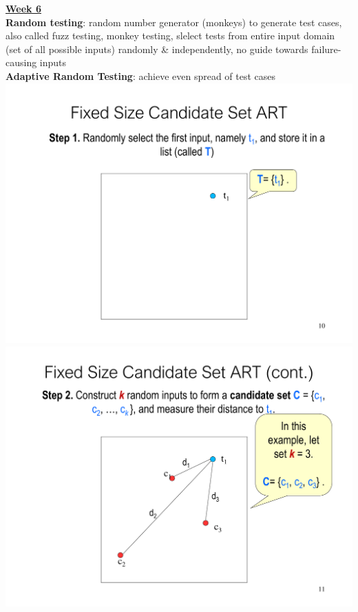 \documentclass[a4paper]{article}
\begin{document}
\begin{multicols}{3}
        \vfill\null\columnbreak\noindent\underline{\textbf{Week 6}}\\
        \textbf{Random testing}: random number generator (monkeys) to generate test cases, also called fuzz testing, monkey testing, slelect tests from entire input domain (set of all possible inputs) randomly \& independently, no guide towards failure-causing inputs\\
        \textbf{Adaptive Random Testing}: achieve even spread of test cases\\
        \includegraphics[width=\linewidth]{259.pdf}\\
        \includegraphics[width=\linewidth]{260.pdf}\\

\end{multicols}
\end{document}
